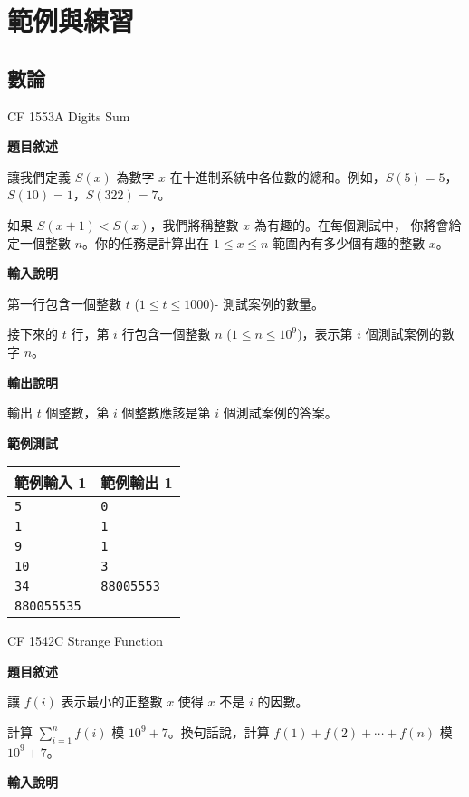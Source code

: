 \section{範例與練習}
    \subsection{數論}

    \problem CF 1553A Digits Sum

    \textbf{題目敘述}

    讓我們定義 $S(x)$ 為數字 $x$ 在十進制系統中各位數的總和。例如，$S(5)=5$，$S(10)=1$，$S(322)=7$。

    如果 $S(x+1) < S(x)$，我們將稱整數 $x$ 為有趣的。在每個測試中，
    你將會給定一個整數 $n$。你的任務是計算出在 $1 \le x \le n$ 範圍內有多少個有趣的整數 $x$。

    \textbf{輸入說明}

    第一行包含一個整數 $t$ ($1 \le t \le 1000$)- 測試案例的數量。

    接下來的 $t$ 行，第 $i$ 行包含一個整數 $n$ ($1 \le n \le 10^9$)，表示第 $i$ 個測試案例的數字 $n$。

    \textbf{輸出說明}

    輸出 $t$ 個整數，第 $i$ 個整數應該是第 $i$ 個測試案例的答案。

    \textbf{範例測試}

    \begin{tabular}{|m{7cm}|m{7cm}|}
        \hline
        範例輸入 1 & 範例輸出 1 \\
        \hline
        \verb|5| & \verb|0| \\
        \verb|1| & \verb|1| \\
        \verb|9| & \verb|1| \\
        \verb|10| & \verb|3| \\
        \verb|34| & \verb|88005553| \\
        \verb|880055535| & \\
        \hline
    \end{tabular}

    \problem CF 1542C Strange Function

    \textbf{題目敘述}

    讓 $f(i)$ 表示最小的正整數 $x$ 使得 $x$ 不是 $i$ 的因數。

    計算 $\displaystyle\sum_{i=1}^n f(i)$ 模 $10^9+7$。換句話說，計算 $f(1)+f(2)+\cdots+f(n)$ 模 $10^9+7$。

    \textbf{輸入說明}

